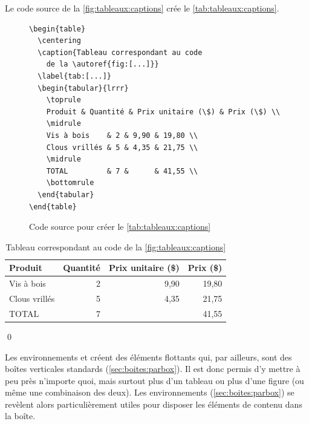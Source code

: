 \begin{exemple}
  Le code source de la \autoref{fig:tableaux:captions} crée
  le \autoref{tab:tableaux:captions}.
  \begin{figure}
\begin{lstlisting}
\begin{table}
  \centering
  \caption{Tableau correspondant au code
    de la \autoref{fig:[...]}}
  \label{tab:[...]}
  \begin{tabular}{lrrr}
    \toprule
    Produit & Quantité & Prix unitaire (\$) & Prix (\$) \\
    \midrule
    Vis à bois    & 2 & 9,90 & 19,80 \\
    Clous vrillés & 5 & 4,35 & 21,75 \\
    \midrule
    TOTAL         & 7 &      & 41,55 \\
    \bottomrule
  \end{tabular}
\end{table}
\end{lstlisting}
    \caption{Code source pour créer le \autoref{tab:tableaux:captions}}
    \label{fig:tableaux:captions}
  \end{figure}
  \begin{table}
    \centering
    \caption{Tableau correspondant au code de la \autoref{fig:tableaux:captions}}
    \label{tab:tableaux:captions}
    \begin{tabular}{lrrr}
      \toprule
      Produit & Quantité & Prix unitaire (\$) & Prix (\$) \\
      \midrule
      Vis à bois    & 2 & 9,90 & 19,80 \\
      Clous vrillés & 5 & 4,35 & 21,75 \\
      \midrule
      TOTAL         & 7 &      & 41,55 \\
      \bottomrule
    \end{tabular}
  \end{table}
  \qed
\end{exemple}

Les environnements  et  créent des éléments
flottants qui, par ailleurs, sont des boîtes verticales standards
(\autoref{sec:boites:parbox}). Il est donc permis d'y mettre à peu
près n'importe quoi, mais surtout plus d'un tableau ou plus d'une
figure (ou même une combinaison des deux). Les environnements
 (\autoref{sec:boites:parbox}) se revèlent alors
particulièrement utiles pour disposer les éléments de contenu dans la
boîte.

